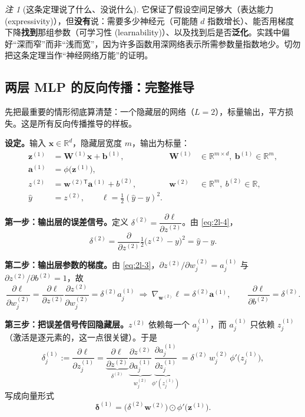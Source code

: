 \documentclass[UTF8,a4paper,11pt]{ctexart}
\theoremstyle{definition}
\theoremstyle{plain}
\theoremstyle{remark}
\newtheorem{remark}[definition]{注}
\newcommand{\R}{\mathbb{R}}
\newcommand{\eng}[1]{\textup{(#1)}}
\begin{document}
\begin{remark}[这条定理说了什么、没说什么]
它保证了假设空间足够大（表达能力 \eng{expressivity}），但\textbf{没有}说：需要多少神经元（可能随 $d$ 指数增长）、能否用梯度下降\textbf{找到}那组参数（可学习性 \eng{learnability}）、以及找到后是否\textbf{泛化}。实践中偏好“深而窄”而非“浅而宽”，因为许多函数用深网络表示所需参数量指数地少。切勿把这条定理当作“神经网络万能”的证明。
\end{remark}

\subsection{两层 MLP 的反向传播：完整推导}

先把最重要的情形彻底算清楚：一个隐藏层的网络（$L=2$），标量输出，平方损失。这是所有反向传播推导的样板。

\textbf{设定。}输入 $\bm{x}\in\R^{d}$，隐藏层宽度 $m$，输出为标量：
\begin{align}
  \bm{z}^{(1)}&=\bm{W}^{(1)}\bm{x}+\bm{b}^{(1)}, & \bm{W}^{(1)}&\in\R^{m\times d},\ \bm{b}^{(1)}\in\R^{m},\label{eq:2l-1}\\
  \bm{a}^{(1)}&=\phi\big(\bm{z}^{(1)}\big), & &\label{eq:2l-2}\\
  z^{(2)}&=\bm{w}^{(2)\mathsf{T}}\bm{a}^{(1)}+b^{(2)}, & \bm{w}^{(2)}&\in\R^{m},\ b^{(2)}\in\R,\label{eq:2l-3}\\
  \hat y&=z^{(2)},\qquad \ell=\tfrac12(\hat y-y)^2 . & &\label{eq:2l-4}
\end{align}

\textbf{第一步：输出层的误差信号。}定义 $\delta^{(2)}=\dfrac{\partial\ell}{\partial z^{(2)}}$。由 \eqref{eq:2l-4}，
\begin{equation}\label{eq:2l-delta2}
  \delta^{(2)}=\frac{\partial}{\partial z^{(2)}}\tfrac12\big(z^{(2)}-y\big)^2=\hat y-y .
\end{equation}

\textbf{第二步：输出层参数的梯度。}由 \eqref{eq:2l-3}，$\partial z^{(2)}/\partial w^{(2)}_j=a^{(1)}_j$ 与 $\partial z^{(2)}/\partial b^{(2)}=1$，故
\begin{equation}\label{eq:2l-gw2}
  \frac{\partial\ell}{\partial w^{(2)}_j}
  =\frac{\partial\ell}{\partial z^{(2)}}\frac{\partial z^{(2)}}{\partial w^{(2)}_j}=\delta^{(2)}a^{(1)}_j
  \ \Longrightarrow\ \nabla_{\bm{w}^{(2)}}\ell=\delta^{(2)}\bm{a}^{(1)},
  \qquad \frac{\partial\ell}{\partial b^{(2)}}=\delta^{(2)} .
\end{equation}

\textbf{第三步：把误差信号传回隐藏层。}$z^{(2)}$ 依赖每一个 $a^{(1)}_j$，而 $a^{(1)}_j$ 只依赖 $z^{(1)}_j$（激活是逐元素的，这一点很关键）。于是
\begin{equation}\label{eq:2l-delta1}
  \delta^{(1)}_j:=\frac{\partial\ell}{\partial z^{(1)}_j}
  =\underbrace{\frac{\partial\ell}{\partial z^{(2)}}}_{\delta^{(2)}}
  \underbrace{\frac{\partial z^{(2)}}{\partial a^{(1)}_j}}_{w^{(2)}_j}
  \underbrace{\frac{\partial a^{(1)}_j}{\partial z^{(1)}_j}}_{\phi'(z^{(1)}_j)}
  =\delta^{(2)}\,w^{(2)}_j\,\phi'\big(z^{(1)}_j\big),
\end{equation}
写成向量形式
\[
  \bm{\delta}^{(1)}=\big(\delta^{(2)}\bm{w}^{(2)}\big)\odot\phi'\big(\bm{z}^{(1)}\big).
\]
\end{document}
